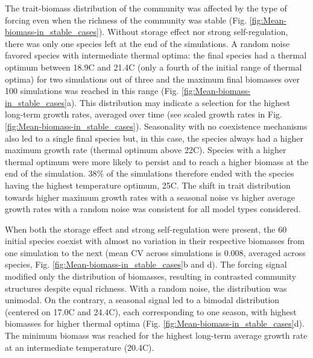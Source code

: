 \documentclass[a4paper,12pt]{article}
\begin{document}
The trait-biomass distribution of the community was affected by the
type of forcing even when the richness of the community was stable
(Fig. \ref{fig:Mean-biomass-in_stable_cases}). Without storage effect
nor strong self-regulation, there was only one species left at the
end of the simulations. A random noise favored species with intermediate
thermal optima: the final species had a thermal optimum between 18.9\textdegree C
and 21.4\textdegree C (only a fourth of the initial range of thermal optima)
for two simulations out of three and the maximum final biomasses over
100 simulations was reached in this range (Fig. \ref{fig:Mean-biomass-in_stable_cases}a).
This distribution may indicate a selection for the highest long-term
growth rates, averaged over time (see scaled growth rates in Fig.
\ref{fig:Mean-biomass-in_stable_cases}). Seasonality with no coexistence
mechanisms also led to a single final species but, in this case, the
species always had a higher maximum growth rate (thermal optimum above
22\textdegree C). Species with a higher thermal optimum were more likely to persist
and to reach a higher biomass at the end of the simulation. 38\% of
the simulations therefore ended with the species having the highest
temperature optimum, 25\textdegree C. The shift in trait distribution towards
higher maximum growth rates with a seasonal noise vs higher average
growth rates with a random noise was consistent for all model types
considered.

When both the storage effect and strong self-regulation were present,
the 60 initial species coexist with almost no variation in their respective
biomasses from one simulation to the next (mean CV across simulations
is 0.008, averaged across species, Fig. \ref{fig:Mean-biomass-in_stable_cases}b
and d). The forcing signal modified only the distribution of biomasses,
resulting in contrasted community structures despite equal richness.
With a random noise, the distribution was unimodal. On the contrary,
a seasonal signal led to a bimodal distribution (centered on 17.0\textdegree C
and 24.4\textdegree C), each corresponding to one season, with highest biomasses
for higher thermal optima (Fig. \ref{fig:Mean-biomass-in_stable_cases}d).
The minimum biomass was reached for the highest long-term average
growth rate at an intermediate temperature (20.4\textdegree C).
\end{document}
